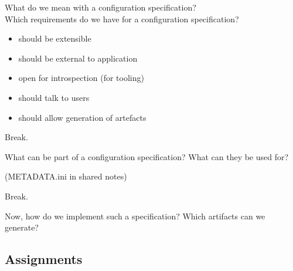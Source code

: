 \begin{assignment}
	\begin{task}
	What do we mean with a configuration specification? \\
	Which requirements do we have for a configuration specification?
	\end{task}

	\pause

	\begin{itemize}
	\item should be extensible
	\item should be external to application
	\item open for introspection (for tooling)
	\item should talk to users
	\item should allow generation of artefacts
	\end{itemize}
\end{assignment}

\begin{assignment}
	\begin{task}
	Break.
	\end{task}
\end{assignment}

\begin{assignment}
	\begin{task}
	What can be part of a configuration specification?
	What can they be used for?
	\end{task}

	(METADATA.ini in shared notes)
\end{assignment}

\begin{assignment}
	\begin{task}
	Break.
	\end{task}
\end{assignment}

\begin{assignment}
	\begin{task}
	Now, how do we implement such a specification?
	Which artifacts can we generate?
	\end{task}
\end{assignment}


\subsection{Assignments}

